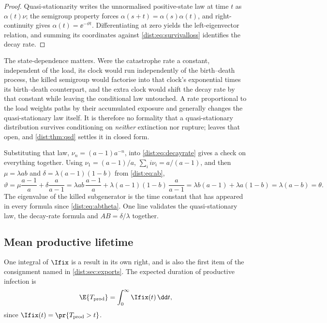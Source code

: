 \begin{proof}
Quasi-stationarity writes the unnormalised positive-state law at time $t$ as
$\alpha(t)\nu$; the semigroup property forces
$\alpha(s+t)=\alpha(s)\alpha(t)$, and right-continuity gives
$\alpha(t)=\ee^{-\vartheta t}$. Differentiating at zero yields the
left-eigenvector relation, and summing its coordinates against
\cref{dist:eq:survivalloss} identifies the decay rate.
\end{proof}

The state-dependence matters. Were the catastrophe rate a constant,
independent of the load, its clock would run independently of the
birth--death process, the killed semigroup would factorise into that clock's
exponential times its birth--death counterpart, and the extra clock would
shift the decay rate by that constant while leaving the conditional law
untouched. A rate proportional to the load weights paths by their accumulated
exposure and generally changes the quasi-stationary law itself. It is
therefore no formality that a quasi-stationary distribution survives
conditioning on \emph{neither} extinction nor rupture; \ChM{} leaves that
open, and \cref{dist:thm:qsd} settles it in closed form.

Substituting that law, $\nu_n=(a-1)a^{-n}$, into \cref{dist:eq:decayrate}
gives a check on everything together. Using $\nu_1=(a-1)/a$,
$\sum_i i\nu_i=a/(a-1)$, and then $\mu=\lambda ab$ and
$\delta=\lambda(a-1)(1-b)$ from \cref{dist:eq:ab},
\begin{equation}
\vartheta=\mu\frac{a-1}{a}+\delta\frac{a}{a-1}
=\lambda ab\,\frac{a-1}{a}+\lambda(a-1)(1-b)\,\frac{a}{a-1}
=\lambda b(a-1)+\lambda a(1-b)=\lambda(a-b)=\theta .
\label{dist:eq:decaycheck}
\end{equation}
The eigenvalue of the killed subgenerator is the time constant that has
appeared in every formula since \cref{dist:eq:abtheta}. One line validates the
quasi-stationary law, the decay-rate formula and $AB=\delta/\lambda$ together.

\subsection{Mean productive lifetime}
\label{dist:sec:lifetime}

One integral of $\Ifix$ is a result in its own right, and is also the first
item of the consignment named in \cref{dist:sec:exports}. The expected
duration of productive infection is
\begin{equation}
\E{T_{\rm prod}}=\int_0^\infty\Ifix(t)\,\dd t,
\label{dist:eq:tprodint}
\end{equation}
since $\Ifix(t)=\pr{T_{\rm prod}>t}$.

